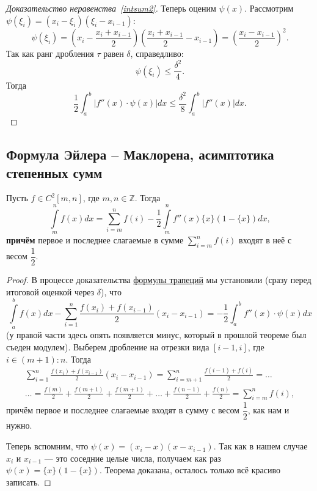 \begin{proof}[Доказательство неравенства~\eqref{intsum2}]
	Теперь оценим \(\psi(x)\). Рассмотрим \(\psi(\xi_i) = (x_i - \xi_i) (\xi_i - x_{i - 1})\): \[
	\psi(\xi_i) = \left(x_i - \frac{x_i + x_{i - 1}}{2} \right) \left(\frac{x_i + x_{i - 1}}{2} - x_{i - 1}\right) = \left(\frac{x_i - x_{i - 1}}{2} \right)^2.
	\]
	Так как ранг дробления \(\tau\) равен \(\delta\), справедливо: \[
	\psi(\xi_i) \leqslant \frac{\delta^2}{4}.
	\]
	Тогда \[
	\frac{1}{2} \int_a^b \left|f''(x) \cdot \psi(x) \right| dx \leqslant \frac{\delta^2}{8} \int_a^b \left|f''(x) \right| dx.
	\]
\end{proof}

\subsection{Формула Эйлера -- Маклорена, асимптотика степенных сумм}

\hypertarget{eumak}{}
\begin{theorem}
	Пусть \(f \in C^2 [m, n]\), где \(m, n \in \mathbb{Z}\). Тогда \[
	\int\limits_m^n f(x) dx = \sum\limits_{i = m}^n f(i) - \frac{1}{2} \int\limits_m^n f''(x) \{x\} (1 - \{x\}) dx,
	\]
	\textbf{причём} первое и последнее слагаемые в сумме \(\sum\limits_{i = m}^n f(i)\) входят в неё с весом $\dfrac{1}{2}$.
\end{theorem}

\begin{proof}
	В процессе доказательства \hyperlink{trap}{формулы трапеций} мы установили (сразу перед итоговой оценкой через \(\delta\)), что \[
	\int\limits_a^b f(x) dx - \sum_{i = 1}^n \frac{f(x_i) + f(x_{i - 1})}{2} (x_i - x_{i - 1}) = -\frac{1}{2} \int_a^b f''(x) \cdot \psi(x) dx
	\]
	(у правой части здесь опять появляется минус, который в прошлой теореме был съеден модулем). Выберем дробление на отрезки вида \([i - 1, i]\), где \(i \in (m + 1) : n\). Тогда
	\begin{gather*}
		\sum_{i = 1}^n \frac{f(x_i) + f(x_{i - 1})}{2} (x_i - x_{i - 1}) = \sum_{i = m + 1}^n \frac{f(i - 1) + f(i)}{2} = \ldots \\
		\ldots = \frac{f(m)}{2} + \frac{f(m + 1)}{2} + \frac{f(m + 1)}{2} + \ldots + \frac{f(n - 1)}{2} + \frac{f(n)}{2} = \sum\limits_{i = m}^n f(i),
	\end{gather*}
	причём первое и последнее слагаемые входят в сумму с весом \(\dfrac{1}{2}\), как нам и нужно.
	
	Теперь вспомним, что \(\psi(x) = (x_i - x) (x - x_{i - 1})\). Так как в нашем случае \(x_i\) и \(x_{i - 1}\) --- это соседние целые числа, получаем как раз \(\psi(x) = \{x\} (1 - \{x\})\). Теорема доказана, осталось только всё красиво записать.
\end{proof}

